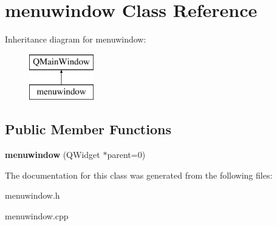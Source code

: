 \hypertarget{classmenuwindow}{}\section{menuwindow Class Reference}
\label{classmenuwindow}
Inheritance diagram for menuwindow\+:\begin{figure}[H]
\begin{center}
\leavevmode
\includegraphics[height=2.000000cm]{classmenuwindow}
\end{center}
\end{figure}
\subsection*{Public Member Functions}
\begin{DoxyCompactItemize}
\item 
\mbox{\label{classmenuwindow_a5741bb25576eb2fb9eba35fe44ae7d6f}} 
{\bfseries menuwindow} (Q\+Widget $\ast$parent=0)
\end{DoxyCompactItemize}


The documentation for this class was generated from the following files\+:\begin{DoxyCompactItemize}
\item 
menuwindow.\+h\item 
menuwindow.\+cpp\end{DoxyCompactItemize}
